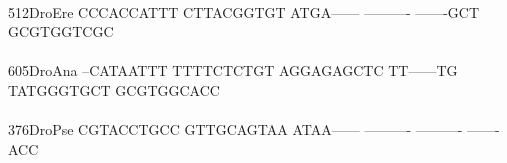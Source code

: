 \documentclass[11pt,twoside,reqno,a4paper]{article}
\begin{document}
{\hspace*{5\charwidth}\hspace*{7\charwidth}\hspace*{1\charwidth}\hspace*{1\charwidth}\hspace*{1\charwidth}\hspace*{1\charwidth}\hspace*{1\charwidth}\hspace*{1\charwidth}\\
512\hspace*{2\charwidth}DroEre	CCCACCATTT	CTTACGGTGT	ATGA------	----------	-------GCT	GCGTGGTCGC	\\
\hspace*{5\charwidth}\hspace*{7\charwidth}\hspace*{1\charwidth}\hspace*{1\charwidth}\hspace*{1\charwidth}\hspace*{1\charwidth}\hspace*{1\charwidth}\hspace*{1\charwidth}\\
605\hspace*{2\charwidth}DroAna	--CATAATTT	TTTTCTCTGT	AGGAGAGCTC	TT------TG	TATGGGTGCT	GCGTGGCACC	\\
\hspace*{5\charwidth}\hspace*{7\charwidth}\hspace*{1\charwidth}\hspace*{1\charwidth}\hspace*{1\charwidth}\hspace*{1\charwidth}\hspace*{1\charwidth}\hspace*{1\charwidth}\\
376\hspace*{2\charwidth}DroPse	CGTACCTGCC	GTTGCAGTAA	ATAA------	----------	----------	-------ACC	\\
\hspace*{5\charwidth}\hspace*{7\charwidth}\hspace*{1\charwidth}\hspace*{1\charwidth}\hspace*{1\charwidth}\hspace*{1\charwidth}\hspace*{1\charwidth}\hspace*{1\charwidth}\\
}
\end{document}
